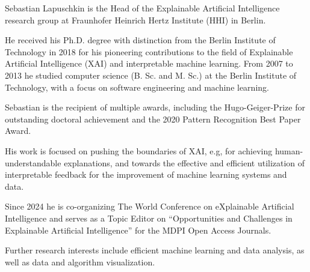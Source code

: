 
\vspace{-1.3em} %

\begin{multicols}{2}  %
\noindent

Sebastian Lapuschkin is the Head of the Explainable Artificial Intelligence research group at Fraunhofer Heinrich Hertz Institute (HHI) in Berlin.

He received his Ph.D. degree with distinction from the Berlin Institute of Technology in 2018
for his pioneering contributions to the field of Explainable Artificial Intelligence (XAI) and interpretable machine learning.
From 2007 to 2013 he studied computer science (B. Sc. and M. Sc.) at the Berlin Institute of Technology,
with a focus on software engineering and machine learning.

Sebastian is the recipient of multiple awards, including the Hugo-Geiger-Prize for outstanding doctoral achievement and the 2020 Pattern Recognition Best Paper Award.

His work is focused on pushing the boundaries of XAI, e.g, for achieving human-understandable explanations,
and towards the effective and efficient utilization of interpretable feedback for the improvement of machine learning systems and data.

Since 2024 he is co-organizing The World Conference on eXplainable Artificial Intelligence and serves as a Topic Editor on ``Opportunities and Challenges in Explainable Artificial Intelligence'' for the MDPI Open Access Journals.

Further research interests include efficient machine learning and data analysis, as well as data and algorithm visualization.

\end{multicols}